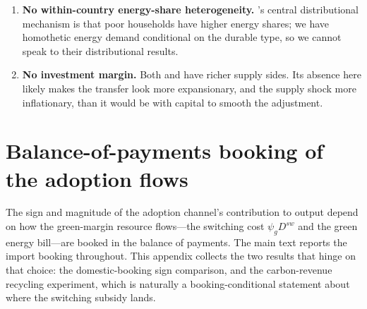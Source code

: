 \documentclass[11pt,a4paper]{article}
\begin{document}
\begin{enumerate}
\item \textbf{No within-country energy-share heterogeneity.}
\citet{Bayer2026}'s central distributional mechanism is that poor households
have higher energy shares; we have homothetic energy demand conditional on
the durable type, so we cannot speak to their distributional results.

\item \textbf{No investment margin.} Both \citet{Bayer2026} and
\citet{ARS2024} have richer supply sides. Its absence here likely makes the
transfer look more expansionary, and the supply shock more inflationary, than
it would be with capital to smooth the adjustment.

\end{enumerate}

\appendix

\section{Balance-of-payments booking of the adoption flows}
\label{app:booking}

The sign and magnitude of the adoption channel's contribution to output depend
on how the green-margin resource flows---the switching cost $\psi_g D^{sw}$ and
the green energy bill---are booked in the balance of payments. The main text
reports the import booking throughout. This appendix collects the two results
that hinge on that choice: the domestic-booking sign comparison, and the
carbon-revenue recycling experiment, which is naturally a booking-conditional
statement about where the switching subsidy lands.
\end{document}
